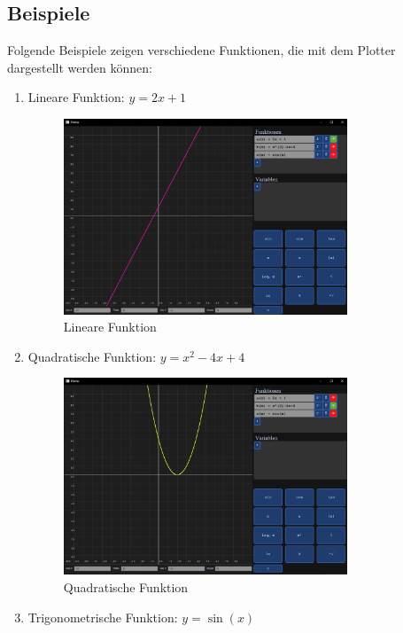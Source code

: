 \documentclass[a4paper]{article}
\begin{document}
\subsection{Beispiele}
Folgende Beispiele zeigen verschiedene Funktionen, die mit dem Plotter dargestellt werden können:

\begin{enumerate}
	\item Lineare Funktion: \(y = 2x + 1\)
	      \begin{figure}[ht]
		      \centering
		      \includegraphics[width=0.8\textwidth]{Resources/example_linear.png}
		      \caption{Lineare Funktion}
		      \label{fig:example_linear}
	      \end{figure}
	      \newpage
	\item Quadratische Funktion: \(y = x^2 - 4x + 4\)
	      \begin{figure}[ht]
		      \centering
		      \includegraphics[width=0.8\textwidth]{Resources/example_quadratic.png}
		      \caption{Quadratische Funktion}
		      \label{fig:example_quadratic}
	      \end{figure}
	\item Trigonometrische Funktion: \(y = \sin(x)\)

\end{enumerate}
\end{document}
